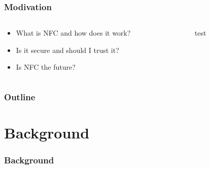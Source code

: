 \documentclass[unknownkeysallowed]{beamer}
\begin{document}
\begin{frame}
\frametitle{Modivation}
  \begin{columns}[T]
    \begin{column}{.5\textwidth}
  		\begin{block}{}
  		  \begin{center}
          \begin{itemize}
    		    \item{What is NFC and how does it work?}
    		    \item{Is it secure and should I trust it?}
    		    \item{Is NFC the future?}
       		\end{itemize}
    		\end{center}
    	\end{block}
    \end{column}
    \begin{column}{.5\textwidth}
        test
    \end{column}
  \end{columns}
\end{frame}

\begin{frame}
  \frametitle{Outline}
    \begin{center}\begin{minipage}{.9\textwidth}
        \tableofcontents[
          currentsection,
          sectionstyle=show/show,
          subsectionstyle=show/shaded/hide
        ]
    \end{minipage}\end{center}
 \end{frame}


\Fontix

\section{Background}
\begin{frame}
  \frametitle{Background}
    \begin{center}\begin{minipage}{.9\textwidth}
    \tableofcontents[currentsubsection, hideothersubsections, sectionstyle=show/shaded]
    \end{minipage}\end{center}
\end{frame}
%
\end{document}
